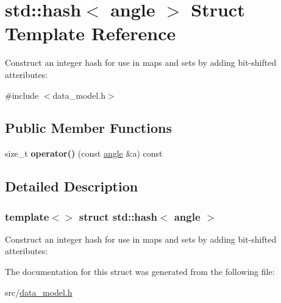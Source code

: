 \hypertarget{structstd_1_1hash_3_01angle_01_4}{}\section{std\+:\+:hash$<$ angle $>$ Struct Template Reference}
\label{structstd_1_1hash_3_01angle_01_4}


Construct an integer hash for use in maps and sets by adding bit-\/shifted atteributes\+:  




{\ttfamily \#include $<$data\+\_\+model.\+h$>$}

\subsection*{Public Member Functions}
\begin{DoxyCompactItemize}
\item 
\mbox{\label{structstd_1_1hash_3_01angle_01_4_a545cf76d8119d6f602bbf0d28804bd87}} 
size\+\_\+t {\bfseries operator()} (const \hyperlink{structtricl_1_1angle}{angle} \&a) const
\end{DoxyCompactItemize}


\subsection{Detailed Description}
\subsubsection*{template$<$$>$\newline
struct std\+::hash$<$ angle $>$}

Construct an integer hash for use in maps and sets by adding bit-\/shifted atteributes\+: 

The documentation for this struct was generated from the following file\+:\begin{DoxyCompactItemize}
\item 
src/\hyperlink{data__model_8h}{data\+\_\+model.\+h}\end{DoxyCompactItemize}
